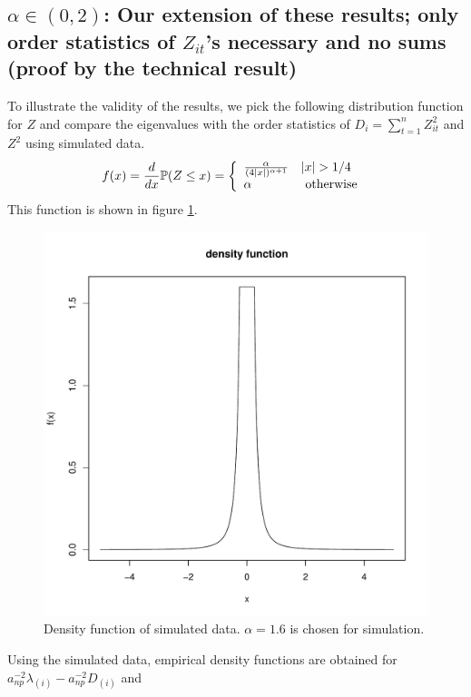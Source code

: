\documentclass[11pt,reqno]{amsart}
\renewcommand{\P}{\mathbb{P}}
\newcommand{\1}{\mathds{1}}
\newcommand{\0}{\boldsymbol{0}}
\newcommand{\4}{\mathchoice{\mskip1.5mu}{\mskip1.5mu}{}{}}
\newcommand{\5}{\mathchoice{\mskip-1.5mu}{\mskip-1.5mu}{}{}}
\newcommand{\2}{\penalty250\mskip\thickmuskip\mskip-\thinmuskip} %
\begin{document}
\subsection{$\alpha \in (0,2)$: Our extension of these results; only
  order statistics of $Z_{it}$'s necessary and no sums (proof by the
  technical result)}
To illustrate the validity of the results, we pick the following
distribution function for $Z$ and compare the eigenvalues with
the order statistics of $D_i = \sum_{t=1}^n Z_{it}^2$ and $Z^2$ using
simulated data.
\begin{equation}
  \label{eq:mydist}
  f(x) = {d \over dx}\P(Z \leq x) = \left\{
    \begin{array}{ll}
      {\alpha \over (4|x|)^{\alpha + 1}} & |x| > 1/4 \\
      \alpha & \text{ otherwise }
    \end{array}
  \right.
\end{equation}
This function is shown in figure \ref{fig:densitySim}.
\begin{figure}[htb!]
  \centering
  \includegraphics[scale=0.40]{densitySim.pdf}
  \caption{Density function of simulated data. $\alpha=1.6$ is chosen
    for simulation.}
  \label{fig:densitySim}
\end{figure}
Using the simulated data, empirical density functions are obtained for
$a_{np}^{-2}\lambda_{(i)} - a_{np}^{-2}D_{(i)}$ and
\end{document}
